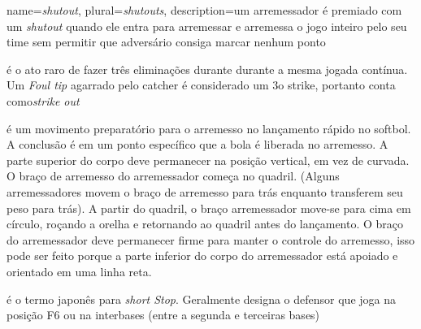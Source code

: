 {
	name={\textit{shutout}},
	plural={\textit{shutouts}},
	description={um arremessador é premiado com um \textit{shutout} quando ele entra para arremessar e arremessa o jogo inteiro pelo seu time sem permitir que adversário consiga marcar nenhum ponto}
}

 	{ é o ato raro de fazer três eliminações durante durante a mesma jogada contínua. Um \textit{Foul tip} agarrado pelo catcher é considerado um 3o strike, portanto conta como\textit{strike out}}

{ é um movimento preparatório para o arremesso no lançamento rápido no softbol. A conclusão é em um ponto específico que a bola é liberada no arremesso. A parte superior do corpo deve permanecer na posição vertical, em vez de curvada. O braço de arremesso do arremessador começa no quadril. (Alguns arremessadores movem o braço de arremesso para trás enquanto transferem seu peso para trás). A partir do quadril, o braço arremessador move-se para cima em círculo, roçando a orelha e retornando ao quadril antes do lançamento. O braço do arremessador deve permanecer firme para manter o controle do arremesso, isso pode ser feito porque a parte inferior do corpo do arremessador está apoiado e orientado em uma linha reta.}

	{ é o termo japonês para \textit{short Stop}. Geralmente designa o defensor que joga na posição F6 ou na interbases (entre a segunda e terceiras bases)}





